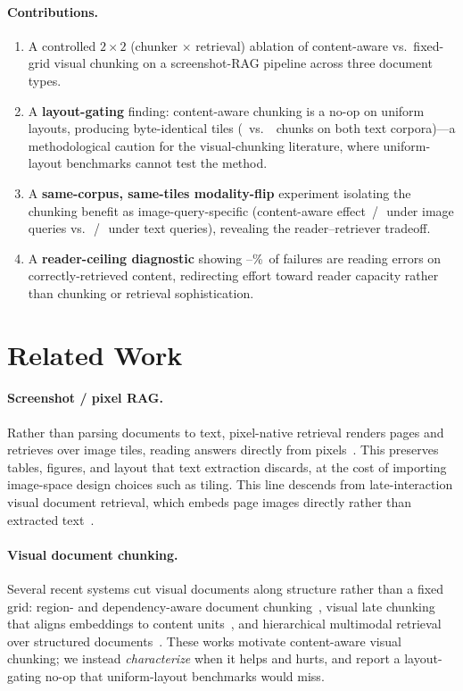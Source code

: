 \documentclass[11pt]{article}
\begin{document}
\paragraph{Contributions.}
\begin{enumerate}\setlength\itemsep{1pt}
  \item A controlled $2\times2$ (chunker $\times$ retrieval) ablation of content-aware vs.\ fixed-grid
        visual chunking on a screenshot-RAG pipeline across three document types.
  \item A \textbf{layout-gating} finding: content-aware chunking is a no-op on uniform layouts, producing
        byte-identical tiles (\NqtChunksFixed\ vs.\ \NqtChunksCa\ chunks on both text corpora)---a
        methodological caution for the visual-chunking literature, where uniform-layout benchmarks cannot
        test the method.
  \item A \textbf{same-corpus, same-tiles modality-flip} experiment isolating the chunking benefit as
        image-query-specific (content-aware effect \CaImgFlatDelta\,/\,\CaImgHierDelta\ under image queries
        vs.\ \CaTxtFlatDelta\,/\,\CaTxtHierDelta\ under text queries), revealing the reader--retriever tradeoff.
  \item A \textbf{reader-ceiling diagnostic} showing \ReaderCeilPctMin--\ReaderCeilPctMax\%\ of failures are
        reading errors on correctly-retrieved content, redirecting effort toward reader capacity rather
        than chunking or retrieval sophistication.
\end{enumerate}

\section{Related Work}\label{sec:related}
\paragraph{Screenshot / pixel RAG.} Rather than parsing documents to text, pixel-native retrieval renders
pages and retrieves over image tiles, reading answers directly from pixels~\citep{pixelrag}. This
preserves tables, figures, and layout that text extraction discards, at the cost of importing image-space
design choices such as tiling. This line descends from late-interaction visual document retrieval, which
embeds page images directly rather than extracted text~\citep{colpali}.

\paragraph{Visual document chunking.} Several recent systems cut visual documents along structure rather
than a fixed grid: region- and dependency-aware document chunking~\citep{m3docdep}, visual late chunking
that aligns embeddings to content units~\citep{colchunk}, and hierarchical multimodal retrieval over
structured documents~\citep{mhierrag}. These works motivate content-aware visual chunking; we instead
\emph{characterize} when it helps and hurts, and report a layout-gating no-op that uniform-layout
benchmarks would miss.
\end{document}
